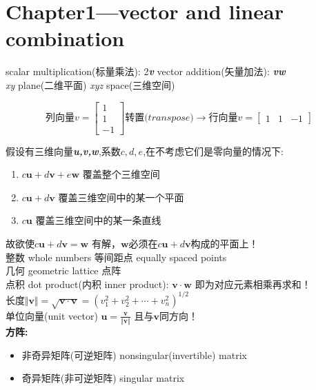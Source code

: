     \section{Chapter1---vector and linear combination}
    
    scalar multiplication(标量乘法): 2\textbf{\textit{v}}
    \quad
    vector addition(矢量加法): \textbf{\textit{vw}}
    \\
    \textit{xy} plane(二维平面) \quad \textit{xyz} space(三维空间)
     
    $$
    \textit{列向量v} =
    \begin{bmatrix}
        1 \\ 1 \\ -1  
    \end{bmatrix}
    \textit{转置(transpose)}\rightarrow
    \textit{行向量v} = 
    \begin{bmatrix}
        1 & 1 & -1
    \end{bmatrix}
    $$

    假设有三维向量\textbf{\textit{u,v,w}},系数$c,d,e$,在不考虑它们是零向量的情况下:
    \begin{enumerate}
            \item $c\bm{u}+d\bm{v}+e\bm{w}$ 覆盖整个三维空间
            \item $c\bm{u}+d\bm{v}$ 覆盖三维空间中的某一个平面
            \item $c\bm{u}$ 覆盖三维空间中的某一条直线
    \end{enumerate}
    故欲使$c\bm{u}+d\bm{v} = \bm{w}$ 有解，$\bm{w}$必须在$c\bm{u}+d\bm{v}$构成的平面上！
    \\
    整数 whole numbers \quad 等间距点 equally spaced points
    \\
    几何 geometric \quad lattice 点阵
    \\
    点积 dot product(内积 inner product): $\bm{v} \cdot \bm{w}$ 即为对应元素相乘再求和！
    \\
    长度$\Vert \bm{v} \Vert = \sqrt{\bm{v \cdot v}} = (v_{1}^{2}+v_{2}^{2}+\cdots+v_{n}^{2})^{1/2}$ 
    \\
    单位向量(unit vector) $\bm{u} = \frac{\bm{v}}{ \Vert \bm{v} \Vert}$ 且与$\bm{v}$同方向！ \\
    \textbf{方阵:}
    \begin{itemize}
        \item 非奇异矩阵(可逆矩阵) nonsingular(invertible) matrix
        \item 奇异矩阵(非可逆矩阵) singular matrix
    \end{itemize}